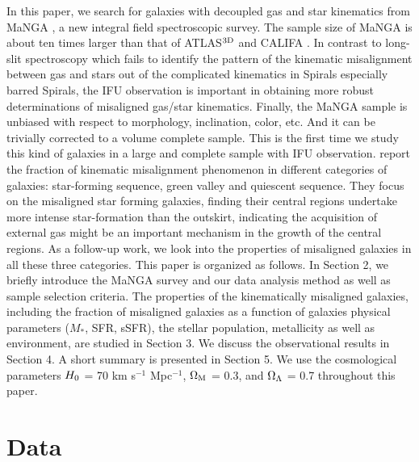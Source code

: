 \documentclass[a4paper,fleqn,usenatbib]{mnras}
\newcommand{\mstar}{$M_*$}
\begin{document}
In this paper, we search for galaxies with decoupled gas and star kinematics from MaNGA 
\citep[Mapping Nearby Galaxies at Apache Point Observatory,][]{bundy-15}, a new integral field spectroscopic survey. 
The sample size of MaNGA is about ten times larger than that of ATLAS$^{\rm3D}$ \citep{cappellari-2011} 
and CALIFA \citep{sanchez-2012}. 
In contrast to long-slit spectroscopy which fails to identify the pattern of the kinematic misalignment between gas and stars out of the complicated kinematics in Spirals especially barred Spirals, the IFU observation is important in obtaining more robust determinations of
misaligned gas/star kinematics.
Finally, the MaNGA sample is unbiased with respect to
morphology, inclination, color, etc. And it can be trivially corrected to a volume complete sample.
This is the first time we study this kind of galaxies in a large and complete sample with IFU observation.
\cite{chen-prep} report the fraction of kinematic misalignment phenomenon 
in different categories of galaxies: star-forming sequence, green valley and quiescent sequence.  
They focus on the misaligned star forming galaxies, finding their central regions undertake more intense star-formation than the outskirt, 
indicating the acquisition of external gas might be an important mechanism in the growth of the central regions.
As a follow-up work, we look into the properties of misaligned galaxies in all these three categories. 
This paper is organized as follows. 
In Section 2, we briefly introduce
the MaNGA survey and our data analysis method as well as sample selection criteria. 
The properties of the kinematically misaligned galaxies, including the fraction of misaligned galaxies 
as a function of galaxies physical parameters (\mstar, SFR, sSFR), the stellar population, metallicity as well as 
environment, are studied in Section 3. We discuss the observational results in Section 4. 
A short summary is presented in Section 5.
We use the cosmological parameters $H_{\rm0}$ = 70 km s$^{-1}$ Mpc$^{-1}$,
$\Omega_{\rm M}$ = 0.3, and $\Omega_{\rm \Lambda}$ = 0.7 throughout this paper.

\section{Data}
\end{document}
